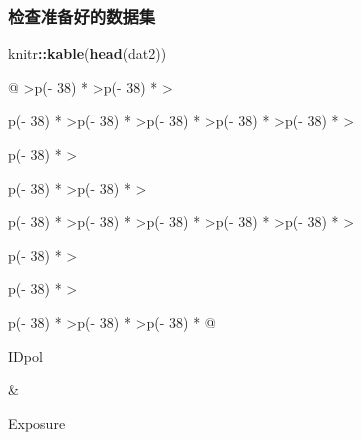\documentclass[
]{article}
\newenvironment{Shaded}{\begin{snugshade}}{\end{snugshade}}
\newcommand{\FunctionTok}[1]{\textcolor[rgb]{0.13,0.29,0.53}{\textbf{#1}}}
\newcommand{\NormalTok}[1]{#1}
\newcommand{\SpecialCharTok}[1]{\textcolor[rgb]{0.81,0.36,0.00}{\textbf{#1}}}
\begin{document}
\subsubsection{检查准备好的数据集}\label{ux68c0ux67e5ux51c6ux5907ux597dux7684ux6570ux636eux96c6}

\begin{Shaded}
\begin{Highlighting}[]
\NormalTok{knitr}\SpecialCharTok{::}\FunctionTok{kable}\NormalTok{(}\FunctionTok{head}\NormalTok{(dat2))}
\end{Highlighting}
\end{Shaded}

\begin{longtable}[]{@{}
  >{\raggedleft\arraybackslash}p{(\columnwidth - 38\tabcolsep) * }
  >{\raggedleft\arraybackslash}p{(\columnwidth - 38\tabcolsep) * }
  >{\raggedright\arraybackslash}p{(\columnwidth - 38\tabcolsep) * }
  >{\raggedleft\arraybackslash}p{(\columnwidth - 38\tabcolsep) * }
  >{\raggedleft\arraybackslash}p{(\columnwidth - 38\tabcolsep) * }
  >{\raggedleft\arraybackslash}p{(\columnwidth - 38\tabcolsep) * }
  >{\raggedleft\arraybackslash}p{(\columnwidth - 38\tabcolsep) * }
  >{\raggedright\arraybackslash}p{(\columnwidth - 38\tabcolsep) * }
  >{\raggedright\arraybackslash}p{(\columnwidth - 38\tabcolsep) * }
  >{\raggedleft\arraybackslash}p{(\columnwidth - 38\tabcolsep) * }
  >{\raggedright\arraybackslash}p{(\columnwidth - 38\tabcolsep) * }
  >{\raggedleft\arraybackslash}p{(\columnwidth - 38\tabcolsep) * }
  >{\raggedleft\arraybackslash}p{(\columnwidth - 38\tabcolsep) * }
  >{\raggedleft\arraybackslash}p{(\columnwidth - 38\tabcolsep) * }
  >{\raggedleft\arraybackslash}p{(\columnwidth - 38\tabcolsep) * }
  >{\raggedright\arraybackslash}p{(\columnwidth - 38\tabcolsep) * }
  >{\raggedright\arraybackslash}p{(\columnwidth - 38\tabcolsep) * }
  >{\raggedright\arraybackslash}p{(\columnwidth - 38\tabcolsep) * }
  >{\raggedleft\arraybackslash}p{(\columnwidth - 38\tabcolsep) * }
  >{\raggedleft\arraybackslash}p{(\columnwidth - 38\tabcolsep) * }@{}}
\toprule\noalign{}
\begin{minipage}[b]{\linewidth}\raggedleft
IDpol
\end{minipage} & \begin{minipage}[b]{\linewidth}\raggedleft
Exposure

\end{minipage}
\end{longtable}
\end{document}
